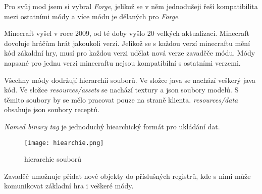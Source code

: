 \documentclass[FM,RP]{tulthesis}
\begin{document}
Pro svůj mod jsem si vybral \textit{Forge}, jelikož se v něm jednodušeji řeší kompatibilita mezi ostatními módy a více módu je dělaných pro \textit{Forge}.

Minecraft vyšel v roce 2009, od té doby vyšlo 20 velkých aktualizací. Minecraft dovoluje hráčům hrát jakoukoli verzi. Jelikož se s každou verzí minecraftu mění kód zákaldní hry, musí pro každou verzi udělat nová verze zavaděče módu. Módy napsané pro jednu verzi minecraftu nejsou kompatibilní s ostatními verzemi.


Všechny módy dodržují hierarchii souborů. Ve složce java se nachází veškerý java kód. Ve složce \textit{resources/assets} se nachází textury a json soubory modelů. S těmito soubory by se mělo pracovat pouze na straně klienta.
\textit{resources/data} obsahuje json soubory receptů. 

\textit{Named binary tag} je jednoduchý hiearchický formát pro ukládání dat.
\begin{figure}
    \centering
    \texttt{[image: hiearchie.png]}
    \caption{hierarchie souborů}
    \label{fig:enter-label}
\end{figure}

Zavaděč umožnuje přidat nové objekty do příslušných registrů, kde s nimi může komunikovat základní hra i veškeré módy. 
\end{document}
